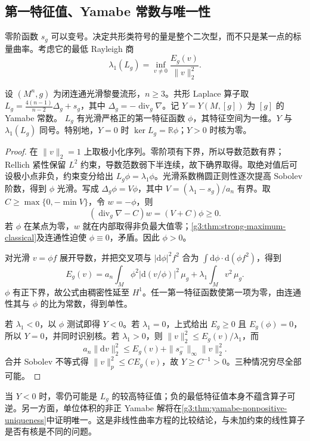 \subsection{第一特征值、Yamabe 常数与唯一性}
\label{g3:subsec:2401:04}
零阶函数 \(s_g\) 可以变号。决定共形类符号的量是整个二次型，而不只是某一点的标量曲率。考虑它的最低 Rayleigh 商
\[
	\lambda_1(L_g)=\inf_{v\ne0}\frac{E_g(v)}{\|v\|_2^2}.
\]
\begin{proposition}\label{g3:prop:yamabe-first-eigenvalue-sign}
	设 \((M^n,g)\) 为闭连通光滑黎曼流形，\(n\ge3\)。共形 Laplace 算子取 \(L_g=\tfrac{4(n-1)}{n-2}\Delta_g+s_g\)，其中 \(\Delta_g=-\operatorname{div}_g\nabla\)。记 \(Y=Y(M,[g])\) 为 \([g]\) 的 Yamabe 常数。
	\(L_g\) 有光滑严格正的第一特征函数 \(\phi\)，其特征空间为一维。\(Y\) 与 \(\lambda_1(L_g)\) 同号。特别地，\(Y=0\) 时 \(\ker L_g=\mathbb R\phi\)；\(Y>0\) 时核为零。
\end{proposition}
\begin{proof}
	在 \(\|v\|_2=1\) 上取极小化序列。零阶项有下界，所以导数范数有界；Rellich 紧性保留 \(L^2\) 约束，导数范数弱下半连续，故下确界取得。取绝对值后可设极小点非负，约束变分给出 \(L_g\phi=\lambda_1\phi\)。光滑系数椭圆正则性逐次提高 Sobolev 阶数，得到 \(\phi\) 光滑。写成 \(\Delta_g\phi=V\phi\)，其中 \(V=(\lambda_1-s_g)/a_n\) 有界。取 \(C\ge\max\{0,-\min V\}\)，令 \(w=-\phi\)，则
	\[
		(\operatorname{div}_g\nabla-C)w=(V+C)\phi\ge0.
	\]
	若 \(\phi\) 在某点为零，\(w\) 就在内部取得非负最大值零；\cref{g3:thm:strong-maximum-classical}及连通性迫使 \(\phi\equiv0\)，矛盾。因此 \(\phi>0\)。

	对光滑 \(v=\phi f\) 展开导数，并把交叉项与 \(|\mathrm d\phi|^2f^2\) 合为 \(\int\mathrm d\phi\cdot\mathrm d(\phi f^2)\)，得到
	\begin{equation}\label{g3:eq:yamabe-ground-state}
		E_g(v)=a_n\int_M\phi^2|\mathrm d(v/\phi)|^2\,\mu_g
		+\lambda_1\int_Mv^2\,\mu_g.
	\end{equation}
	\(\phi\) 有正下界，故公式由稠密性延至 \(H^1\)。任一第一特征函数使第一项为零，由连通性其与 \(\phi\) 的比为常数，得到单性。

	若 \(\lambda_1<0\)，以 \(\phi\) 测试即得 \(Y<0\)。若 \(\lambda_1=0\)，上式给出 \(E_g\ge0\) 且 \(E_g(\phi)=0\)，所以 \(Y=0\)，并同时识别核。若 \(\lambda_1>0\)，则 \(\|v\|_2^2\le E_g(v)/\lambda_1\)，而
	\[
		a_n\|\mathrm dv\|_2^2\le E_g(v)+\|s_g^-\|_\infty\|v\|_2^2.
	\]
	合并 Sobolev 不等式得 \(\|v\|_p^2\le C E_g(v)\)，故 \(Y\ge C^{-1}>0\)。三种情况穷尽全部可能。
\end{proof}

当 \(Y<0\) 时，零仍可能是 \(L_g\) 的较高特征值；负的最低特征值本身不蕴含算子可逆。另一方面，单位体积的非正 Yamabe 解将在\cref{g3:thm:yamabe-nonpositive-uniqueness}中证明唯一。这是非线性曲率方程的比较结论，与未加约束的线性算子是否有核是不同的问题。


